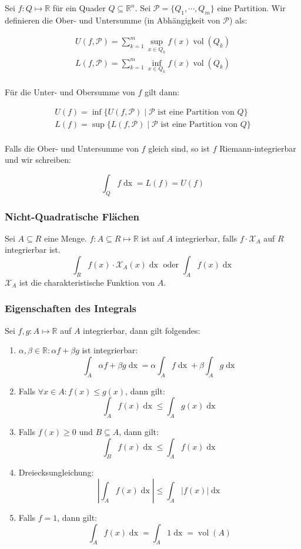 \documentclass[a4paper,10pt]{article}
\def\R{\mathbb{R}}
\def\X{\mathcal{X}}
\def\dx{\mathop{dx}}
\DeclareMathOperator{\vol}{\text{vol}}
\begin{document}
Sei $f: Q \mapsto \R$ für ein Quader $Q \subseteq \R^n$. Sei $\mathcal{P} = \{Q_1, \cdots, Q_m\}$ eine Partition. Wir definieren die Ober- und Untersumme (in Abhängigkeit von $\mathcal{P}$) als:

\begin{align*}
  U(f, \mathcal{P}) = \sum_{k=1}^m \sup_{x \in Q_k} f(x) \vol(Q_k)\\
  L(f, \mathcal{P}) = \sum_{k=1}^m \inf_{x \in Q_k} f(x) \vol(Q_k)
\end{align*}
\\
Für die Unter- und Obersumme von $f$ gilt dann:

\begin{align*}
  U(f) = \inf \{ U(f, \mathcal{P}) \mid \mathcal{P}\text{ ist eine Partition von }Q \}\\
  L(f) = \sup \{ L(f, \mathcal{P}) \mid \mathcal{P}\text{ ist eine Partition von }Q \}
\end{align*}
\\
Falls die Ober- und Untersumme von $f$ gleich sind, so ist $f$ Riemann-integrierbar und wir schreiben:

$$ \int_Q f \dx = L(f) = U(f) $$

\subsubsection*{Nicht-Quadratische Flächen}
Sei \(A \subseteq R\) eine Menge. \(f : A \subseteq R \mapsto \R\) ist auf \(A\) integrierbar, falls \(f \cdot \X_A\) auf \(R\) integrierbar ist. 
\[\int_R f(x) \cdot \X_A(x) \mathop{dx} \text{ oder } \int_A f(x) \mathop{dx}\]
\(\X_A\) ist die charakteristische Funktion von \(A\).

\subsubsection*{Eigenschaften des Integrals}
Sei \(f,g : A \mapsto \R\) auf \(A\) integrierbar, dann gilt folgendes:
\begin{enumerate}
  \item \(\alpha, \beta \in \R: \alpha f + \beta g\) ist integrierbar:
  \[\int_A \alpha f + \beta g \mathop{dx} = \alpha \int_A f \mathop{dx} + \beta \int_A g \mathop{dx}\]
  \item Falls \(\forall x \in A: f(x) \le g(x)\), dann gilt:
  \[\int_A f(x) \mathop{dx} \le \int_A g(x) \mathop{dx}\]
  \item Falls \(f(x) \ge 0\) und \(B \subseteq A\), dann gilt:
  \[\int_B f(x) \mathop{dx} \le \int_A f(x) \mathop{dx}\]
  \item Dreiecksungleichung:
    \[\left| \int_A f(x) \mathop{dx}\right| \le \int_A \left|f(x)\right| \mathop{dx}\]
  \item Falls \(f = 1\), dann gilt:
  \[\int_A f(x) \mathop{dx} = \int_A 1 \mathop{dx} = \vol(A)\]
\end{enumerate}
\end{document}
